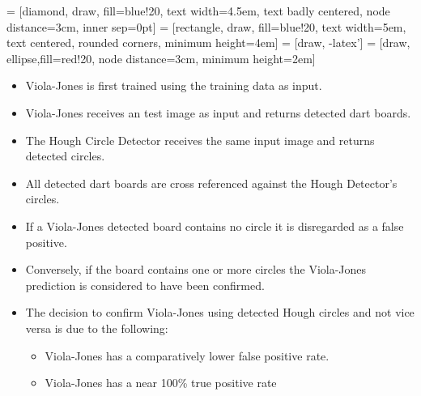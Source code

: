 \documentclass[conference]{IEEEtran}
\begin{document}
 = [diamond, draw, fill=blue!20, 
text width=4.5em, text badly centered, node distance=3cm, inner sep=0pt]
 = [rectangle, draw, fill=blue!20, 
text width=5em, text centered, rounded corners, minimum height=4em]
 = [draw, -latex']
 = [draw, ellipse,fill=red!20, node distance=3cm,
minimum height=2em]


\begin{itemize}
	\item Viola-Jones is first trained using the training data as input.
	\item Viola-Jones receives an test image as input and returns detected dart boards.
	\item The Hough Circle Detector receives the same input image and returns detected circles.
	\item All detected dart boards are cross referenced against the Hough Detector's circles.
	\item If a Viola-Jones detected board contains no circle it is disregarded as a false positive.
	\item Conversely, if the board contains one or more circles the Viola-Jones prediction is considered to have been confirmed.
	\item The decision to confirm Viola-Jones using detected Hough circles and not vice versa is due to the following: 
	\begin{itemize}
		\item Viola-Jones has a comparatively lower false positive rate.
		\item Viola-Jones has a near 100\% true positive rate
	\end{itemize}
\end{itemize}
\end{document}

